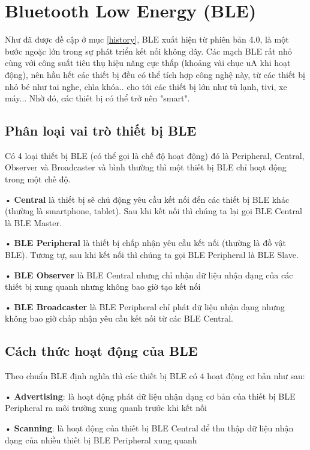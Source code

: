 \section{Bluetooth Low Energy (BLE) }  %
\label{section1.3} %
Như đã được đề cập ở mục \ref{history}, BLE xuất hiện từ phiên bản 4.0, là một bước ngoặc lớn trong sự phát triển kết nối không dây. Các mạch BLE rất nhỏ cùng với công suất tiêu thụ hiệu năng cực thấp (khoảng vài chục uA khi hoạt động), nên hầu hết các thiết bị đều có thể tích hợp công nghệ này, từ các thiết bị nhỏ bé như tai nghe, chìa khóa.. cho tới các thiết bị lớn như tủ lạnh, tivi, xe máy... Nhờ đó, các thiết bị có thể trở nên "smart".
\subsection{Phân loại vai trò thiết bị BLE}
Có 4 loại thiết bị BLE (có thể gọi là chế độ hoạt động) đó là Peripheral, Central, Observer và Broadcaster và bình thường thì một thiết bị BLE chỉ hoạt động  trong một chế độ.

• \textbf{Central} là thiết bị sẽ chủ động yêu cầu kết nối đến các thiết bị BLE khác (thường là smartphone, tablet). Sau khi kết nối thì chúng ta lại gọi BLE Central là  BLE Master.

• \textbf{BLE Peripheral} là thiết bị chấp nhận yêu cầu kết nối (thường là đồ vật BLE). Tương tự, sau khi kết nối thì chúng ta gọi BLE Peripheral là BLE Slave.

• \textbf{BLE Observer} là BLE Central nhưng chỉ nhận dữ liệu nhận dạng của các thiết bị xung quanh nhưng không bao giờ tạo kết nối

• \textbf{BLE Broadcaster} là BLE Peripheral chỉ phát dữ liệu nhận dạng nhưng không bao giờ chấp nhận yêu cầu kết nối từ các BLE Central.
\newpage
\subsection{Cách thức hoạt động của BLE}
Theo chuẩn BLE định nghĩa thì các thiết bị BLE có 4 hoạt động cơ bản như sau:

• \textbf{Advertising}: là hoạt động phát dữ liệu nhận dạng cơ bản của thiết bị BLE Peripheral ra môi trường xung quanh trước khi kết nối

• \textbf{Scanning}: là hoạt động của thiết bị BLE Central để thu thập dữ liệu nhận dạng của nhiều thiết bị BLE Peripheral xung quanh

